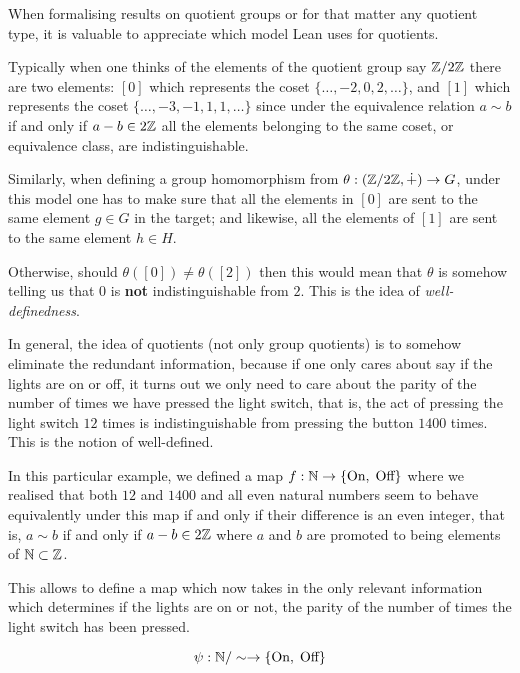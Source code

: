     \begin{remark}
    When formalising results on quotient groups or for that matter any quotient type, it is valuable to appreciate which model Lean uses for quotients. 
    
    Typically when one thinks of the elements of the quotient group say $\mathbb{Z}/2\mathbb{Z}$ there are two elements: 
    $[0]$ which represents the coset $\{\ldots, -2, 0, 2, \ldots\}$, and $[1]$ which represents the coset $\{\ldots, -3, -1, 1, 1, \ldots\}$
    since under the equivalence relation $a \sim b$ if and only if $a - b \in 2\mathbb{Z}$ all the elements belonging to the same coset, or equivalence class,
    are indistinguishable.

    Similarly, when defining a group homomorphism from $\theta : (\mathbb{Z} /2\mathbb{Z}, \dot{+}) \rightarrow G$, under this model one has to make sure that
    all the elements in $[0]$ are sent to the same element $g \in G$ in the target; and likewise, all the elements of $[1]$ are sent to the same element $h \in H$.

    Otherwise, should $\theta([0]) \ne \theta([2])$ then this would mean that $\theta$ is somehow telling us that $0$ is \textbf{not} indistinguishable from $2$.
    This is the idea of \textit{well-definedness}.

    In general, the idea of quotients (not only group quotients) is to somehow eliminate the redundant information, because if one only cares about say if the lights are on or off,
    it turns out we only need to care about the parity of the number of times we have pressed the light switch, that is, the act of pressing the light switch $12$ 
    times is indistinguishable from pressing the button $1400$ times. This is the notion of well-defined.

    In this particular example, we defined a map $f : \mathbb{N} \rightarrow \{\text{On}, \; \text{Off}\}$ where we realised
    that both $12$ and $1400$ and all even natural numbers seem to behave equivalently under this map if and only if their difference is an even integer,
    that is, $a \sim b$ if and only if $a - b \in 2\mathbb{Z}$ where $a$ and $b$ are promoted to being elements of $\mathbb{N} \subset \mathbb{Z}$.
    
    This allows to define a map which now takes in the only relevant information which determines if the lights are on or not,
    the parity of the number of times the light switch has been pressed.
    
    \[
    \psi : \mathbb{N} / \sim \rightarrow \{\text{On}, \; \text{Off}\}
    \]


\end{remark}
